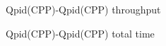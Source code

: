 \documentclass{thesis}
\begin{document}
\begin{figure}[tb] 
\centering
\caption{Qpid(CPP)-Qpid(CPP) throughput}
\label{qpid-qpid-throughput}
\end{figure}

\begin{figure}[tb] 
\centering
\caption{Qpid(CPP)-Qpid(CPP) total time}
\label{qpid-qpid-total-time}
\end{figure}
\end{document}
